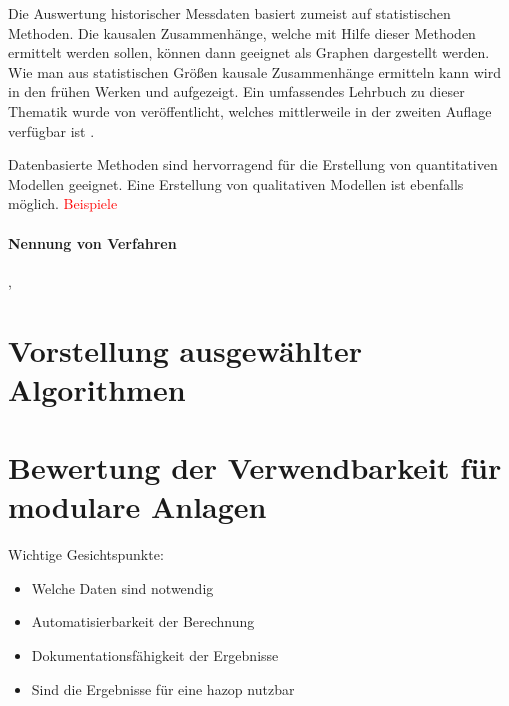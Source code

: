 Die Auswertung historischer Messdaten basiert zumeist auf statistischen Methoden. Die kausalen Zusammenh\"ange, welche mit Hilfe dieser Methoden ermittelt werden sollen, k\"onnen dann geeignet als Graphen dargestellt werden. Wie man aus statistischen Gr\"o\ss{}en kausale Zusammenh\"ange ermitteln kann wird in den fr\"uhen Werken \textcite{Holland_1986} und  \textcite{Pearl_1995} aufgezeigt. Ein umfassendes Lehrbuch zu dieser Thematik wurde von \citeauthor{Pearl_2009} ver\"offentlicht, welches mittlerweile in der zweiten Auflage verf\"ugbar ist \cite{Pearl_2009}.

Datenbasierte Methoden sind hervorragend f\"ur die Erstellung von quantitativen Modellen geeignet. Eine Erstellung von qualitativen Modellen ist ebenfalls m\"oglich. \textcolor{red}{Beispiele}
\paragraph*{Nennung von Verfahren}
\cite{Zhang_2017}, \cite{Thornhill_2006}



\section{Vorstellung ausgew\"ahlter Algorithmen}
\section{Bewertung der Verwendbarkeit f\"ur modulare Anlagen}
Wichtige Gesichtspunkte:
\begin{itemize}
\item Welche Daten sind notwendig
\item Automatisierbarkeit der Berechnung
\item Dokumentationsf\"ahigkeit der Ergebnisse
\item Sind die Ergebnisse f\"ur eine \ac{hazop} nutzbar
\end{itemize}
